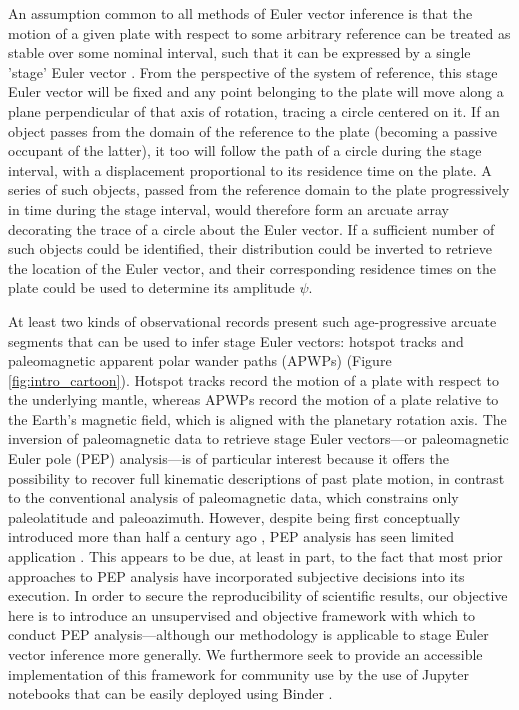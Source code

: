 \documentclass{article} %
\begin{document}
An assumption common to all methods of Euler vector inference is that the motion of a given plate with respect to some arbitrary reference can be treated as stable over some nominal interval, such that it can be expressed by a single 'stage' Euler vector \citep{gordon1984paleomagnetic, cox1986plate}. From the perspective of the system of reference, this stage Euler vector will be fixed and any point belonging to the plate will move along a plane perpendicular of that axis of rotation, tracing a circle centered on it. If an object passes from the domain of the reference to the plate (becoming a passive occupant of the latter), it too will follow the path of a circle during the stage interval, with a displacement proportional to its residence time on the plate. A series of such objects, passed from the reference domain to the plate progressively in time during the stage interval, would therefore form an arcuate array decorating the trace of a circle about the Euler vector. If a sufficient number of such objects could be identified, their distribution could be inverted to retrieve the location of the Euler vector, and their corresponding residence times on the plate could be used to determine its amplitude $\psi$.

At least two kinds of observational records present such age-progressive arcuate segments that can be used to infer stage Euler vectors: hotspot tracks and paleomagnetic apparent polar wander paths (APWPs) (Figure \ref{fig:intro_cartoon}). Hotspot tracks record the motion of a plate with respect to the underlying mantle, whereas APWPs record the motion of a plate relative to the Earth's magnetic field, which is aligned with the planetary rotation axis. The inversion of paleomagnetic data to retrieve stage Euler vectors---or paleomagnetic Euler pole (PEP) analysis---is of particular interest because it offers the possibility to recover full kinematic descriptions of past plate motion, in contrast to the conventional analysis of paleomagnetic data, which constrains only paleolatitude and paleoazimuth. However, despite being first conceptually introduced more than half a century ago \citep{francheteau1969paleomagnetism}, PEP analysis has seen limited application \citep[e.g.][]{smirnov2010co,wu2017absolute,swanson2019failed,beck2003absolute, gordon1984paleomagnetic}. This appears to be due, at least in part, to the fact that most prior approaches to PEP analysis have incorporated subjective decisions into its execution. In order to secure the reproducibility of scientific results, our objective here is to introduce an unsupervised and objective framework with which to conduct PEP analysis---although our methodology is applicable to stage Euler vector inference more generally. We furthermore seek to provide an accessible implementation of this framework for community use by the use of Jupyter notebooks \citep{Kluyver:2016aa} that can be easily deployed using Binder \citep{project_jupyter-proc-scipy-2018}.
\end{document}
